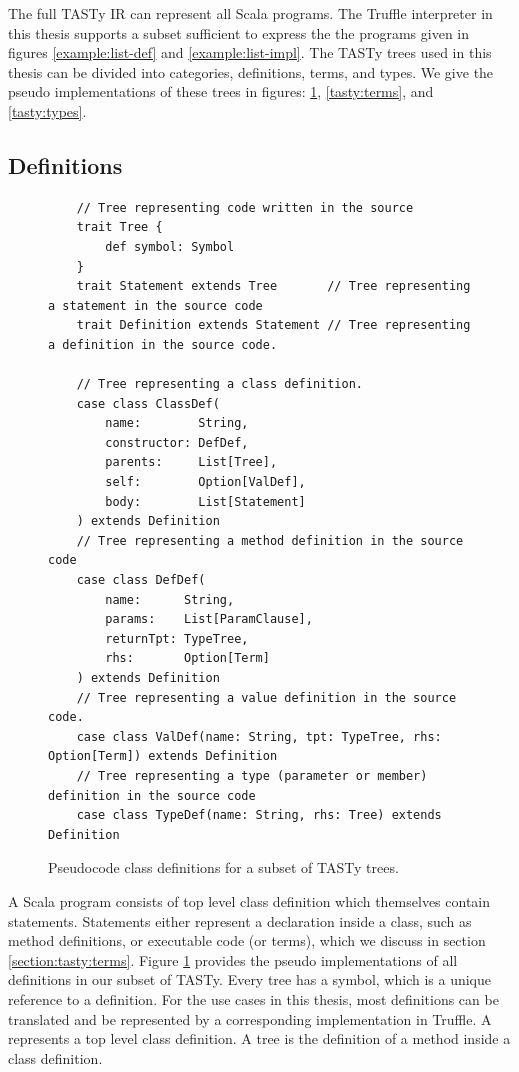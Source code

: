 The full TASTy IR can represent all Scala programs.
The Truffle interpreter in this thesis supports a subset sufficient to express the the programs given in figures \ref{example:list-def} and \ref{example:list-impl}.
The TASTy trees used in this thesis can be divided into categories, definitions, terms, and types. 
We give the pseudo implementations of these trees in figures: \ref{tasty:defs}, \ref{tasty:terms}, and \ref{tasty:types}.

\subsection{Definitions}

\begin{figure}[!htb]
	\begin{verbatim}
	// Tree representing code written in the source
	trait Tree {
		def symbol: Symbol
	}                         
	trait Statement extends Tree       // Tree representing a statement in the source code
	trait Definition extends Statement // Tree representing a definition in the source code.
		
	// Tree representing a class definition.
	case class ClassDef(
		name:        String,
		constructor: DefDef, 
		parents:     List[Tree], 
		self:        Option[ValDef], 
		body:        List[Statement]
	) extends Definition
	// Tree representing a method definition in the source code
	case class DefDef(
		name:      String, 
		params:    List[ParamClause], 
		returnTpt: TypeTree, 
		rhs:       Option[Term]
	) extends Definition
	// Tree representing a value definition in the source code.
	case class ValDef(name: String, tpt: TypeTree, rhs: Option[Term]) extends Definition
	// Tree representing a type (parameter or member) definition in the source code
	case class TypeDef(name: String, rhs: Tree) extends Definition
	\end{verbatim} 
	\caption{Pseudocode class definitions for a subset of TASTy trees.}
	\label{tasty:defs}
\end{figure}

A Scala program consists of top level class definition which themselves contain statements.
Statements either represent a declaration inside a class, such as method definitions, or executable code (or terms), which we discuss in section \ref{section:tasty:terms}.
Figure \ref{tasty:defs} provides the pseudo implementations of all definitions in our subset of TASTy.
Every tree has a symbol, which is a unique reference to a definition.
For the use cases in this thesis, most definitions can be translated and be represented by a corresponding implementation in Truffle.
A  represents a top level class definition.
A  tree is the definition of a method inside a class definition.

